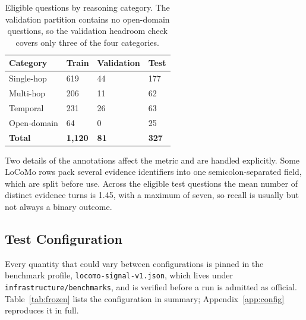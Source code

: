 \documentclass[12pt,letterpaper,oneside]{report}
\newcommand{\code}[1]{\texttt{\small #1}}
\newenvironment{tab}{\begingroup\singlespacing\small}{\endgroup}
\begin{document}
\begin{table}[htbp]
\caption[Eligible questions by reasoning category]{Eligible questions by reasoning category. The validation partition
contains no open-domain questions, so the validation headroom check covers only
three of the four categories.}
\label{tab:categories}
\centering
\begin{tab}
\begin{tabular}{@{}L{1.5in}R{0.85in}R{0.95in}R{0.85in}@{}}
\toprule
\textbf{Category} & \textbf{Train} & \textbf{Validation} &
\textbf{Test} \\
\midrule
Single-hop   & 619 & 44 & 177 \\
Multi-hop    & 206 & 11 & 62  \\
Temporal     & 231 & 26 & 63  \\
Open-domain  & 64  & 0  & 25  \\
\midrule
\textbf{Total} & \textbf{1,120} & \textbf{81} & \textbf{327} \\
\bottomrule
\end{tabular}
\end{tab}
\end{table}

Two details of the annotations affect the metric and are handled explicitly.
Some LoCoMo rows pack several evidence identifiers into one semicolon-separated
field, which are split before use. Across the eligible test questions the mean
number of distinct evidence turns is 1.45, with a maximum of seven, so recall
is usually but not always a binary outcome.

\subsection{Test Configuration}
\label{sec:testconfig}

Every quantity that could vary between configurations is pinned in the
benchmark profile, \code{locomo-signal-v1.json}, which lives under
\code{infrastructure/benchmarks}, and is verified before a
run is admitted as official. Table~\ref{tab:frozen} lists the configuration in
summary; Appendix~\ref{app:config} reproduces it in full.
\end{document}
